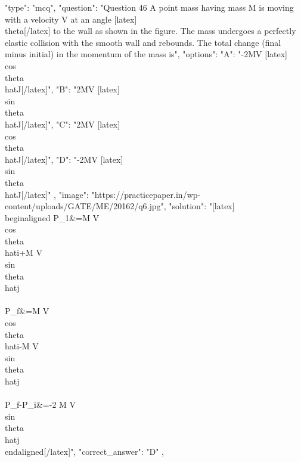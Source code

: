   {
    "type": "mcq",
    "question": "Question 46 A point mass having mass M is moving with a velocity V at an angle [latex]\\theta[/latex] to the wall as shown in the figure. The mass undergoes a perfectly elastic collision with the smooth wall and rebounds. The total change (final minus initial) in the momentum of the mass is",
    "options": {
      "A": "-2MV [latex]\\cos \\theta \\hat{J}[/latex]",
      "B": "2MV [latex]\\sin \\theta \\hat{J}[/latex]",
      "C": "2MV [latex]\\cos \\theta \\hat{J}[/latex]",
      "D": "-2MV [latex]\\sin \\theta \\hat{J}[/latex]"
    },
    "image": "https://practicepaper.in/wp-content/uploads/GATE/ME/20162/q6.jpg",
    "solution": "[latex] \\begin{aligned} P_{1}&=M V \\cos \\theta \\hat{i}+M V \\sin \\theta \\hat{j} \\\\ P_{f}&=M V \\cos \\theta \\hat{i}-M V \\sin \\theta \\hat{j} \\\\ P_{f}-P_{i}&=-2 M V \\sin \\theta \\hat{j} \\end{aligned}[/latex]",
    "correct_answer": "D"
  },
